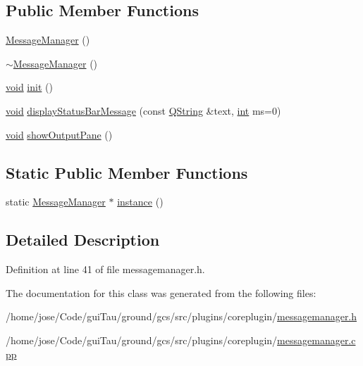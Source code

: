 \subsection*{Public Member Functions}
\begin{DoxyCompactItemize}
\item 
\hyperlink{group___core_plugin_gaf8bf800ee9a6a8e723a8062d740c9d50}{Message\-Manager} ()
\item 
\hyperlink{group___core_plugin_ga4b5866d0faa20904470a48a6ba5f6eab}{$\sim$\-Message\-Manager} ()
\item 
\hyperlink{group___u_a_v_objects_plugin_ga444cf2ff3f0ecbe028adce838d373f5c}{void} \hyperlink{group___core_plugin_ga87092893657c545a84d8d274fbe9796f}{init} ()
\item 
\hyperlink{group___u_a_v_objects_plugin_ga444cf2ff3f0ecbe028adce838d373f5c}{void} \hyperlink{group___core_plugin_ga63a31179d9d4b427bcb9fb19f9ead31c}{display\-Status\-Bar\-Message} (const \hyperlink{group___u_a_v_objects_plugin_gab9d252f49c333c94a72f97ce3105a32d}{Q\-String} \&text, \hyperlink{ioapi_8h_a787fa3cf048117ba7123753c1e74fcd6}{int} ms=0)
\item 
\hyperlink{group___u_a_v_objects_plugin_ga444cf2ff3f0ecbe028adce838d373f5c}{void} \hyperlink{group___core_plugin_gabe6c93254cf37ff7c22cf9622fd9bf81}{show\-Output\-Pane} ()
\end{DoxyCompactItemize}
\subsection*{Static Public Member Functions}
\begin{DoxyCompactItemize}
\item 
static \hyperlink{class_core_1_1_message_manager}{Message\-Manager} $\ast$ \hyperlink{group___core_plugin_ga186a2b8a42ce68a6c42dacfe025b559e}{instance} ()
\end{DoxyCompactItemize}


\subsection{Detailed Description}


Definition at line 41 of file messagemanager.\-h.



The documentation for this class was generated from the following files\-:\begin{DoxyCompactItemize}
\item 
/home/jose/\-Code/gui\-Tau/ground/gcs/src/plugins/coreplugin/\hyperlink{messagemanager_8h}{messagemanager.\-h}\item 
/home/jose/\-Code/gui\-Tau/ground/gcs/src/plugins/coreplugin/\hyperlink{messagemanager_8cpp}{messagemanager.\-cpp}\end{DoxyCompactItemize}
